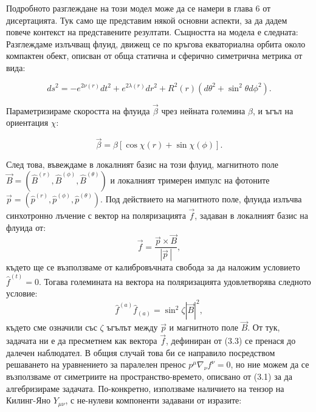 \documentclass[12pt]{article}
\numberwithin{equation}{section}
\numberwithin{figure}{section}
\begin{document}
	Подробното разглеждане на този модел може да се намери в глава 6 от дисертацията. Тук само ще представим някой основни аспекти, за да дадем повече контекст на представените резултати. Същността на модела е следната:\\
	
	Разглеждаме излъчващ флуид, движещ се по кръгова екваториална орбита около компактен обект, описван от обща статична и сферично симетрична метрика от вида:
	
	\begin{equation}
		ds^2 = - e^{2\nu(r)}dt^2 + e^{2\lambda(r)}dr^2 + R^2(r)\left(d\theta^2 + \sin^2\theta d\phi^2\right).
	\end{equation}
	
	Параметризираме скоростта на флуида $\vec{\beta}$ чрез нейната големина $\beta$, и ъгъл на ориентация $\chi$:
	
	\begin{equation}
		\vec{\beta} = \beta\left[\cos\chi (r) + \sin\chi (\phi)\right].
	\end{equation}
	
	След това, въвеждаме в локалният базис на този флуид, магнитното поле $\vec{B} = (\hat{B}^{(r)},\hat{B}^{(\phi)},\hat{B}^{(\theta)})$ и локалният тримерен импулс на фотоните $\vec{p} = \left(\hat{p}^{(r)},\hat{p}^{(\phi)},\hat{p}^{(\theta)}\right)$. Под действието на магнитното поле, флуида излъчва синхотронно лъчение с вектор на поляризацията $\vec{f}$, задаван в локалният базис на флуида от:
	\begin{equation}
		\vec{f} = \frac{\vec{p}\times\vec{B}}{|\vec{p}\,|},
	\end{equation}
	където ще се възползваме от калибровъчната свобода за да наложим условието $\hat{f}^{(t)} = 0$. Тогава големината на вектора на поляризацията удовлетворява следното условие:
	\begin{equation}
		\hat{f}^{(a)}\hat{f}_{(a)} = \sin^2\zeta|\vec{B}|^2,
	\end{equation}
	където сме означили със $\zeta$ ъгълът между $\vec{p}$ и магнитното поле $\vec{B}$. От тук, задачата ни е да пресметнем как вектора $\vec{f}$, дефиниран от (3.3) се пренася до далечен наблюдател. В общия случай това би се направило посредством решаването на уравнението за паралелен пренос $p^\mu\nabla_\nu f^\nu =0$, но ние можем да се възползваме от симетриите на пространство-времето, описвано от (3.1) за да алгебризираме задачата. По-конкретно, използваме наличието на тензор на Килинг-Яно $Y_{\mu\nu}$, с не-нулеви компоненти задавани от изразите:
	
\end{document}
